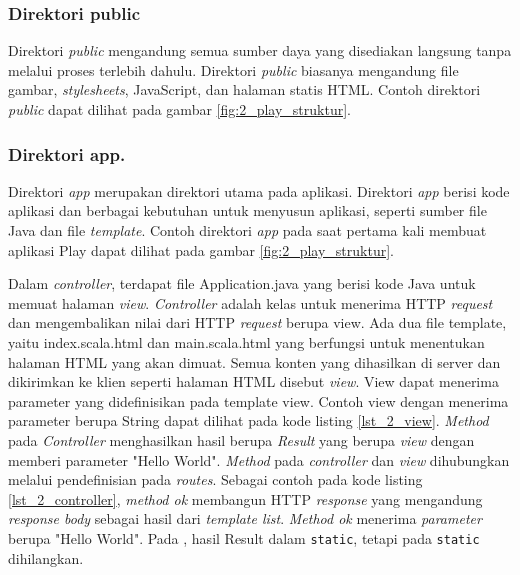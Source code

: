 \subsubsection{Direktori public}
Direktori \textit{public} mengandung semua sumber daya yang disediakan langsung tanpa melalui proses terlebih dahulu. Direktori \textit{public} biasanya mengandung file gambar, \textit{stylesheets}, JavaScript, dan halaman statis HTML. Contoh direktori \textit{public} dapat dilihat pada gambar \ref{fig:2_play_struktur}.
%

\subsubsection{Direktori app.}
Direktori \textit{app} merupakan direktori utama pada aplikasi. Direktori \textit{app} berisi kode aplikasi dan berbagai kebutuhan untuk menyusun aplikasi, seperti sumber file Java dan file \textit{template}. Contoh direktori \textit{app} pada saat pertama kali membuat aplikasi Play dapat dilihat pada gambar \ref{fig:2_play_struktur}. 

Dalam \textit{controller}, terdapat file Application.java yang berisi kode Java untuk memuat halaman \textit{view}. \textit{Controller} adalah kelas untuk menerima HTTP \textit{request} dan mengembalikan nilai dari HTTP \textit{request} berupa view. Ada dua file template, yaitu index.scala.html dan main.scala.html yang berfungsi untuk menentukan halaman HTML yang akan dimuat. Semua konten yang dihasilkan di server dan dikirimkan ke klien seperti halaman HTML disebut \textit{view}. View dapat menerima parameter yang didefinisikan pada template view. Contoh view dengan menerima parameter berupa String dapat dilihat pada kode listing \ref{lst_2_view}. \textit{Method} pada \textit{Controller} menghasilkan hasil berupa \textit{Result} yang berupa \textit{view} dengan memberi parameter "Hello World". \textit{Method} pada \textit{controller} dan \textit{view} dihubungkan melalui pendefinisian pada \textit{routes}. Sebagai contoh pada kode listing \ref{lst_2_controller}, \textit{method ok} membangun HTTP \textit{response} yang mengandung \textit{response body} sebagai hasil dari \textit{template list}. \textit{Method ok} menerima \textit{parameter} berupa "Hello World". Pada \cite{playforjava}, hasil Result dalam \verb!static!, tetapi pada  \verb!static! dihilangkan.

